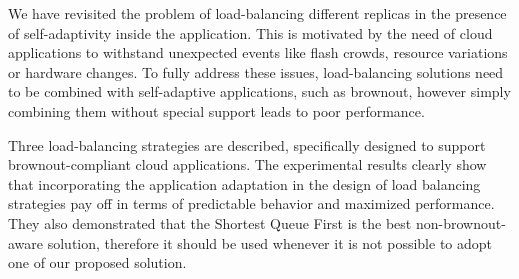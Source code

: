 We have revisited the problem of load-balancing different replicas in
the presence of self-adaptivity inside the application.  This is
motivated by the need of cloud applications to withstand unexpected
events like flash crowds, resource variations or hardware changes.  To
fully address these issues, load-balancing solutions need to be
combined with self-adaptive applications, such as brownout, however
simply combining them without special support leads to poor
performance.

Three load-balancing strategies are described, specifically designed
to support brownout-compliant cloud applications.  The experimental
results clearly show that incorporating the application adaptation in
the design of load balancing strategies pay off in terms of
predictable behavior and maximized performance. They also demonstrated
that the Shortest Queue First is the best non-brownout-aware solution,
therefore it should be used whenever it is not possible to adopt one
of our proposed solution.


